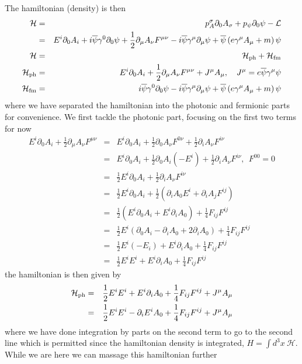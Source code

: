 \documentclass[aps,preprint,preprintnumbers,nofootinbib,showpacs,prd]{revtex4-1}
\newcommand{\nbea}{\begin{eqnarray*}}
\newcommand{\neea}{\end{eqnarray*}}
\begin{document}
The hamiltonian (density) is then
%
\nbea
\mathcal{H} & = & p_A^{\sigma}\partial_0 A_\sigma + p_\psi \partial_0 \psi - \mathcal{L} \\
& = & E^i \partial_0 A_i + i \overline \psi \gamma^0 \partial_0 \psi + \frac{1}{2} \partial_\mu A_\nu F^{\mu\nu} - i \overline \psi \gamma^\mu \partial_\mu \psi + \overline \psi \left ( e \gamma^\mu A_\mu + m\right ) \psi \\
\mathcal{H} & = & \mathcal{H}_{\rm ph} + \mathcal{H}_{\rm fm} \\
\mathcal{H}_{\rm ph} & = & E^i \partial_0 A_i + \frac{1}{2} \partial_\mu A_\nu F^{\mu\nu} + J^\mu A_\mu,~~~ J^\mu = e \overline \psi \gamma^\mu \psi \\
\mathcal{H}_{\rm fm} & = & i \overline \psi \gamma^0 \partial_0 \psi - i \overline \psi \gamma^\mu \partial_\mu \psi + \overline \psi \left ( e \gamma^\mu A_\mu + m\right ) \psi 
\neea
%
where we have separated the hamiltonian into the photonic and fermionic parts for convenience. We first tackle the photonic part, focusing on the first two terms for now
%
\nbea
E^i \partial_0 A_i + \frac{1}{2} \partial_\mu A_\nu F^{\mu\nu} & = & E^i \partial_0 A_i + \frac{1}{2} \partial_0 A_\nu F^{0\nu} + \frac{1}{2} \partial_i A_\nu F^{i\nu} \\
& = & E^i \partial_0 A_i + \frac{1}{2} \partial_0 A_i (-E^i)+ \frac{1}{2} \partial_i A_\nu F^{i\nu}, ~~F^{00} = 0 \\
& = & \frac{1}{2} E^i \partial_0 A_i + \frac{1}{2} \partial_i A_\nu F^{i\nu} \\
& = & \frac{1}{2} E^i \partial_0 A_i + \frac{1}{2} \left ( \partial_i A_0 E^i +  \partial_i A_j F^{i j} \right ) \\
& = & \frac{1}{2} \left ( E^i \partial_0 A_i + E^i \partial_i A_0 \right ) + \frac{1}{4} F_{ij}F^{ij} \\
& = & \frac{1}{2} E^i \left ( \partial_0 A_i - \partial_i A_0 + 2\partial_i A_0 \right ) + \frac{1}{4} F_{ij}F^{ij}\\
& = & \frac{1}{2} E^i (-E_i) + E^i \partial_i A_0 + \frac{1}{4} F_{ij}F^{ij} \\
& = & \frac{1}{2} E^i E^i + E^i \partial_i A_0 + \frac{1}{4} F_{ij}F^{ij}
\neea
%
the hamiltonian is then given by
%
\nbea
\mathcal{H}_{\rm ph} & = & \frac{1}{2} E^i E^i + E^i \partial_i A_0 + \frac{1}{4} F_{ij}F^{ij} + J^\mu A_\mu \\
& = & \frac{1}{2} E^i E^i - \partial_i E^i A_0 + \frac{1}{4} F_{ij}F^{ij} + J^\mu A_\mu
\neea
%
where we have done integration by parts on the second term to go to the second line which is permitted since the hamiltonian density is integrated, $H = \int d^3x~ \mathcal{H}$. While we are here we can massage this hamiltonian further
\end{document}
